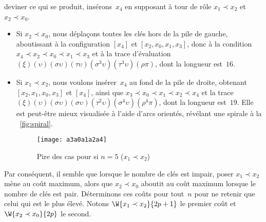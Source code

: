 deviner ce qui se produit, insérons~\(x_4\) en supposant à tour de
rôle \(x_1 \prec x_2\) et \(x_2 \prec x_0\).
\begin{itemize}

\item Si \(x_2 \prec x_0\), nous déplaçons toutes les clés hors de la
  pile de gauche, aboutissant à la configuration \([x_4]\) et \([x_2,
  x_0, x_1, x_3]\), donc à la condition \(x_4 \prec x_2 \prec x_0
  \prec x_1 \prec x_3\) et à la trace d'évaluation
  \((\xi)(\upsilon)(\sigma\upsilon)(\tau\upsilon)(\sigma^3\upsilon)
  (\tau^3\upsilon)(\rho\pi)\), dont la longueur est~\(16\).

\item Si \(x_1 \prec x_2\), nous voulons insérer~\(x_4\) au fond de la
  pile de droite, obtenant \([x_2, x_1, x_0, x_3]\) et \([x_4]\),
  ainsi que \(x_3 \prec x_0 \prec x_1 \prec x_2 \prec x_4\) et la
  trace \((\xi)(\upsilon)
  (\sigma\upsilon)(\sigma\upsilon)(\tau^2\upsilon)(\sigma^4\upsilon)
  (\rho^4\pi)\), dont la longueur est~\(19\). Elle est peut-être mieux
  visualisée à l'aide d'arcs orientés, révélant une spirale à la
  \fig~\vref{fig:spiral}.
  \begin{figure}[b]
    \centering
    \texttt{[image: a3a0a1a2a4]}
    \caption{Pire des cas pour  si \(n=5\) (\(x_1 \prec x_2\))
             \label{fig:spiral}}
  \end{figure}

\end{itemize}
Par conséquent, il semble que lorsque le nombre de clés est impair,
poser \(x_1 \prec x_2\) mène au coût maximum, alors que \(x_2 \prec
x_0\) aboutit au coût maximum lorsque le nombre de clés est
pair. Déterminons ces coûts pour tout~\(n\) pour ne retenir que celui
qui est le plus élevé. Notons \(\W{x_1 \prec x_2}{2p+1}\) le premier
coût et \(\W{x_2 \prec x_0}{2p}\) le second.
